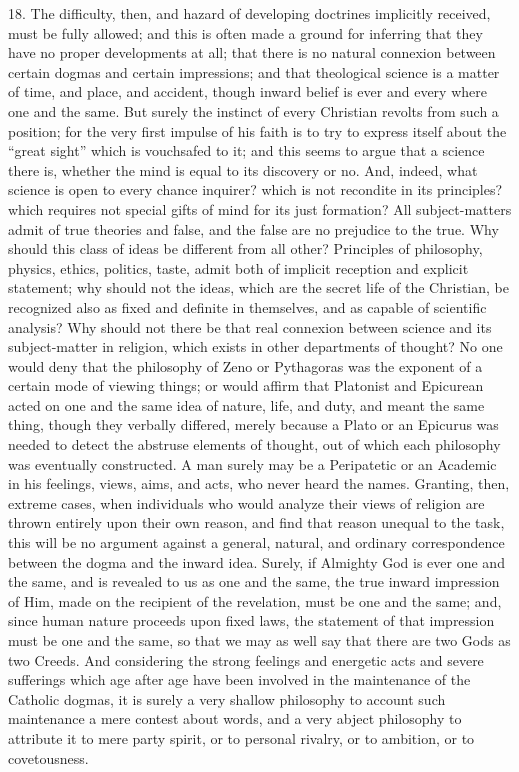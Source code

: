 18. The difficulty, then, and hazard of developing doctrines
implicitly received, must be fully allowed; and this is often made a
ground for inferring that they have no proper developments at all;
that there is no natural connexion between certain dogmas and certain
impressions; and that theological science is a matter of time, and
place, and accident, though inward belief is ever and every where one
and the same. But surely the instinct of every Christian revolts from
such a position; for the very first impulse of his faith is to try to
express itself about the ``great sight'' which is vouchsafed
to it; and this seems to argue that a science there is, whether the
mind is equal to its discovery or no. And, indeed, what science is
open to every chance inquirer? which is not recondite in its
principles? which requires not special gifts of mind for its just
formation? All subject-matters admit of true theories and false, and
the false are no prejudice to the true. Why should this class of ideas
be different from all other? Principles of philosophy, physics,
ethics, politics, taste, admit both of implicit reception and explicit
statement; why should not the ideas, which are the secret life of the
Christian, be recognized also as fixed and definite in themselves, and
as capable of scientific analysis? Why should not there be that real
connexion between science and its subject-matter in religion, which
exists in other departments of thought? No one would deny that the
philosophy of Zeno or Pythagoras was the exponent of a certain mode of
viewing things; or would affirm that Platonist and Epicurean acted on
one and the same idea of nature, life, and duty, and meant the same
thing, though they verbally differed, merely because a Plato or an
Epicurus was needed to detect the abstruse elements of thought, out of
which each philosophy was eventually constructed. A man surely may be
a Peripatetic or an Academic in his feelings, views, aims, and acts,
who never heard the names. Granting, then, extreme cases, when
individuals who would analyze their views of religion are thrown
entirely upon their own reason, and find that reason unequal to the
task, this will be no argument against a general, natural, and
ordinary correspondence between the dogma and the inward idea. Surely,
if Almighty God is ever one and the same, and is revealed to us as one
and the same, the true inward impression of Him, made on the recipient
of the revelation, must be one and the same; and, since human nature
proceeds upon fixed laws, the statement of that impression must be one
and the same, so that we may as well say that there are two Gods as
two Creeds. And considering the strong feelings and energetic acts and
severe sufferings which age after age have been involved in the
maintenance of the Catholic dogmas, it is surely a very shallow
philosophy to account such maintenance a mere contest about words, and
a very abject philosophy to attribute it to mere party spirit, or to
personal rivalry, or to ambition, or to covetousness.

